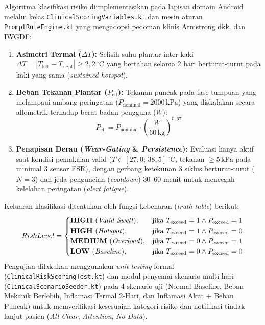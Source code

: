 Algoritma klasifikasi risiko diimplementasikan pada lapisan domain Android melalui kelas \texttt{ClinicalScoringVariables.kt} dan mesin aturan \texttt{PromptRuleEngine.kt} yang mengadopsi pedoman klinis Armstrong dkk. dan IWGDF:
\begin{enumerate}
    \item \textbf{Asimetri Termal ($\Delta T$):} Selisih suhu plantar inter-kaki $\Delta T = |T_{\mathrm{left}} - T_{\mathrm{right}}| \ge 2{,}2\,^\circ\mathrm{C}$ yang bertahan selama 2 hari berturut-turut pada kaki yang sama (\textit{sustained hotspot}).
    \item \textbf{Beban Tekanan Plantar ($P_{\mathrm{eff}}$):} Tekanan puncak pada fase tumpuan yang melampaui ambang peringatan ($P_{\mathrm{nominal}} = 2000\,\mathrm{kPa}$) yang diskalakan secara allometrik terhadap berat badan pengguna ($W$):
    \begin{equation}
    P_{\mathrm{eff}} = P_{\mathrm{nominal}} \cdot \left(\frac{W}{60\,\mathrm{kg}}\right)^{0{,}67}
    \end{equation}
    \item \textbf{Penapisan Derau (\textit{Wear-Gating} \& \textit{Persistence}):} Evaluasi hanya aktif saat kondisi pemakaian valid ($T \in [27{,}0;\, 38{,}5]\,^\circ\mathrm{C}$, tekanan $\ge 5\,\mathrm{kPa}$ pada minimal 3 sensor FSR), dengan gerbang ketekunan 3 siklus berturut-turut ($N=3$) dan jeda penguncian (\textit{cooldown}) 30–60 menit untuk mencegah kelelahan peringatan (\textit{alert fatigue}).
\end{enumerate}

Keluaran klasifikasi ditentukan oleh fungsi kebenaran (\textit{truth table}) berikut:
\begin{equation}
RiskLevel = 
\begin{cases} 
\mathbf{HIGH} \text{ (\textit{Valid Swell})}, & \text{jika } T_{\mathrm{exceed}} = 1 \land P_{\mathrm{exceed}} = 1 \\ 
\mathbf{HIGH} \text{ (\textit{Hotspot})}, & \text{jika } T_{\mathrm{exceed}} = 1 \land P_{\mathrm{exceed}} = 0 \\ 
\mathbf{MEDIUM} \text{ (\textit{Overload})}, & \text{jika } T_{\mathrm{exceed}} = 0 \land P_{\mathrm{exceed}} = 1 \\ 
\mathbf{LOW} \text{ (\textit{Baseline})}, & \text{jika } T_{\mathrm{exceed}} = 0 \land P_{\mathrm{exceed}} = 0 
\end{cases}
\end{equation}
Pengujian dilakukan menggunakan \textit{unit testing} formal (\texttt{ClinicalRiskScoringTest.kt}) dan modul penyemai skenario multi-hari (\texttt{ClinicalScenarioSeeder.kt}) pada 4 skenario uji (Normal Baseline, Beban Mekanik Berlebih, Inflamasi Termal 2-Hari, dan Inflamasi Akut + Beban Puncak) untuk memverifikasi kesesuaian kategori risiko dan notifikasi tindak lanjut pasien (\textit{All Clear}, \textit{Attention}, \textit{No Data}).

